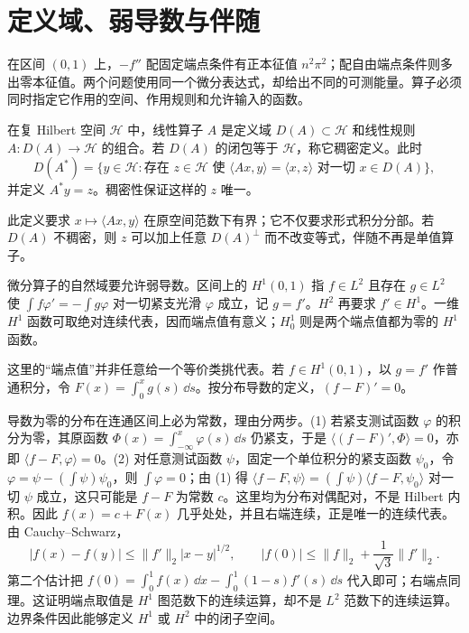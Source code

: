 \section{定义域、弱导数与伴随}
在区间 \((0,1)\) 上，\(-f''\) 配固定端点条件有正本征值 \(n^2\pi^2\)；配自由端点条件则多出零本征值。两个问题使用同一个微分表达式，却给出不同的可测能量。算子必须同时指定它作用的空间、作用规则和允许输入的函数。



\begin{definition}[稠密定义的算子与伴随]
在复 Hilbert 空间 \(\mathcal H\) 中，线性算子 \(A\) 是定义域 \(D(A)\subset\mathcal H\) 和线性规则 \(A:D(A)\to\mathcal H\) 的组合。若 \(D(A)\) 的闭包等于 \(\mathcal H\)，称它稠密定义。此时
\[
D(A^*)=\{y\in\mathcal H:\text{存在 }z\in\mathcal H\text{ 使 }\langle Ax,y\rangle=\langle x,z\rangle\text{ 对一切 }x\in D(A)\},
\]
并定义 \(A^*y=z\)。稠密性保证这样的 \(z\) 唯一。
\end{definition}

此定义要求 \(x\mapsto\langle Ax,y\rangle\) 在原空间范数下有界；它不仅要求形式积分分部。若 \(D(A)\) 不稠密，则 \(z\) 可以加上任意 \(D(A)^\perp\) 而不改变等式，伴随不再是单值算子。

微分算子的自然域要允许弱导数。区间上的 \(H^1(0,1)\) 指 \(f\in L^2\) 且存在 \(g\in L^2\) 使 \(\int f\varphi'=-\int g\varphi\) 对一切紧支光滑 \(\varphi\) 成立，记 \(g=f'\)。\(H^2\) 再要求 \(f'\in H^1\)。一维 \(H^1\) 函数可取绝对连续代表，因而端点值有意义；\(H_0^1\) 则是两个端点值都为零的 \(H^1\) 函数。

这里的“端点值”并非任意给一个等价类挑代表。若 \(f\in H^1(0,1)\)，以 \(g=f'\) 作普通积分，令 \(F(x)=\int_0^x g(s)\,\dd s\)。按分布导数的定义，\((f-F)'=0\)。

导数为零的分布在连通区间上必为常数，理由分两步。(1) 若紧支测试函数 \(\varphi\) 的积分为零，其原函数 \(\Phi(x)=\int_{-\infty}^x\varphi(s)\,\dd s\) 仍紧支，于是 \(\langle (f-F)',\Phi\rangle=0\)，亦即 \(\langle f-F,\varphi\rangle=0\)。(2) 对任意测试函数 \(\psi\)，固定一个单位积分的紧支函数 \(\psi_0\)，令 \(\varphi=\psi-(\int\psi)\psi_0\)，则 \(\int\varphi=0\)；由 (1) 得
\(\langle f-F,\psi\rangle=(\int\psi)\langle f-F,\psi_0\rangle\) 对一切 \(\psi\) 成立，这只可能是 \(f-F\) 为常数 \(c\)。这里均为分布对偶配对，不是 Hilbert 内积。因此 \(f(x)=c+F(x)\) 几乎处处，并且右端连续，正是唯一的连续代表。由 Cauchy--Schwarz，
\[
 |f(x)-f(y)|\le\|f'\|_2|x-y|^{1/2},\qquad
 |f(0)|\le \|f\|_2+\frac1{\sqrt3}\|f'\|_2.
\]
第二个估计把 \(f(0)=\int_0^1f(x)\,\dd x-\int_0^1(1-s)f'(s)\,\dd s\) 代入即可；右端点同理。这证明端点取值是 \(H^1\) 图范数下的连续运算，却不是 \(L^2\) 范数下的连续运算。边界条件因此能够定义 \(H^1\) 或 \(H^2\) 中的闭子空间。

